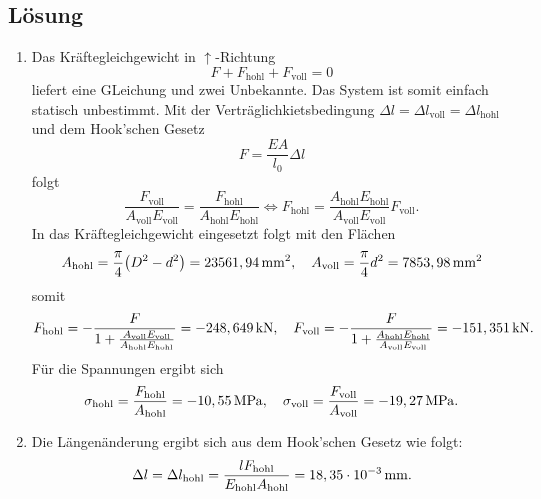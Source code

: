 \documentclass{exercise}
\begin{document}
    \subsection*{Lösung}
    \begin{enumerate}
        \item Das Kräftegleichgewicht in \(\uparrow\)-Richtung
        \[
            F + F_{\text{hohl}} + F_{\text{voll}} = 0
        \]
        liefert eine GLeichung und zwei Unbekannte.
        Das System ist somit einfach statisch unbestimmt.
        Mit der Verträglichkietsbedingung \(\Delta l = \Delta l_{\text{voll}} = \Delta l_{\text{hohl}}\) und dem Hook'schen Gesetz
        \[
            F = \frac{EA}{l_0}\Delta l
        \]
        folgt
        \[
            \frac{F_{\text{voll}}}{A_{\text{voll}}E_{\text{voll}}} = \frac{F_{\text{hohl}}}{A_{\text{hohl}}E_{\text{hohl}}} \iff F_{\text{hohl}} = \frac{A_{\text{hohl}}E_{\text{hohl}}}{A_{\text{voll}}E_{\text{voll}}}F_{\text{voll}}.
        \]
        In das Kräftegleichgewicht eingesetzt folgt mit den Flächen
        \[
            A_{\text{hohl}} = \frac{\pi}{4}\parentheses*{D^2 - d^2} = 23561,94\sis{\milli\meter\squared}, \quad A_{\text{voll}} = \frac{\pi}{4}d^2 = 7853,98\sis{\milli\meter\squared}
        \]
        somit
        \[
            F_{\text{hohl}} = -\frac{F}{1 + \frac{A_{\text{voll}}E_{\text{voll}}}{A_{\text{hohl}}E_{\text{hohl}}}} = -248,649\,\si{\kilo\newton}, \quad F_{\text{voll}} = -\frac{F}{1 + \frac{A_{\text{hohl}}E_{\text{hohl}}}{A_{\text{voll}}E_{\text{voll}}}} = -151,351\,\si{\kilo\newton}.
        \]
        Für die Spannungen ergibt sich
        \[
            \sigma_{\text{hohl}} = \frac{F_{\text{hohl}}}{A_{\text{hohl}}} = -10,55\,\si{\mega\pascal}, \quad \sigma_{\text{voll}} = \frac{F_{\text{voll}}}{A_{\text{voll}}} = -19,27\,\si{\mega\pascal}.
        \]
        \item Die Längenänderung ergibt sich aus dem Hook'schen Gesetz wie folgt:
        \[
            \Delta l = \Delta l_{\text{hohl}} = \frac{lF_{\text{hohl}}}{E_{\text{hohl}}A_{\text{hohl}}} = 18,35 \cdot 10^{-3}\,\si{\milli\meter}.
        \]
    \end{enumerate}
\end{document}
